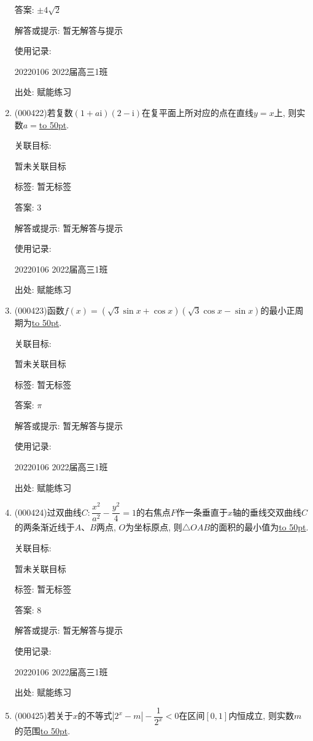 \documentclass[10pt,a4paper]{article}
\newcommand{\blank}[1]{\underline{\hbox to #1pt{}}}
\begin{document}
\begin{enumerate}[1.]
答案: $\pm 4\sqrt 2$

解答或提示: 暂无解答与提示

使用记录:

20220106	2022届高三1班	


出处: 赋能练习
\item { (000422)}若复数$(1+a\mathrm{i})(2-\mathrm{i})$在复平面上所对应的点在直线$y=x$上, 则实数$a=$\blank{50}.


关联目标:

暂未关联目标



标签: 暂无标签

答案: $3$

解答或提示: 暂无解答与提示

使用记录:

20220106	2022届高三1班	


出处: 赋能练习
\item { (000423)}函数$f(x)=(\sqrt3\sin x+\cos x)(\sqrt3\cos x-\sin x)$的最小正周期为\blank{50}.


关联目标:

暂未关联目标



标签: 暂无标签

答案: $\pi$

解答或提示: 暂无解答与提示

使用记录:

20220106	2022届高三1班	


出处: 赋能练习
\item { (000424)}过双曲线$C:\dfrac{x^2}{a^2}-\dfrac{y^2}4=1$的右焦点$F$作一条垂直于$x$轴的垂线交双曲线$C$的两条渐近线于$A$、$B$两点, $O$为坐标原点, 则$\triangle OAB$的面积的最小值为\blank{50}.


关联目标:

暂未关联目标



标签: 暂无标签

答案: $8$

解答或提示: 暂无解答与提示

使用记录:

20220106	2022届高三1班	


出处: 赋能练习
\item { (000425)}若关于$x$的不等式$|2^x-m|-\dfrac1{2^x}<0$在区间$[0,1]$内恒成立, 则实数$m$的范围\blank{50}.



\end{enumerate}
\end{document}
